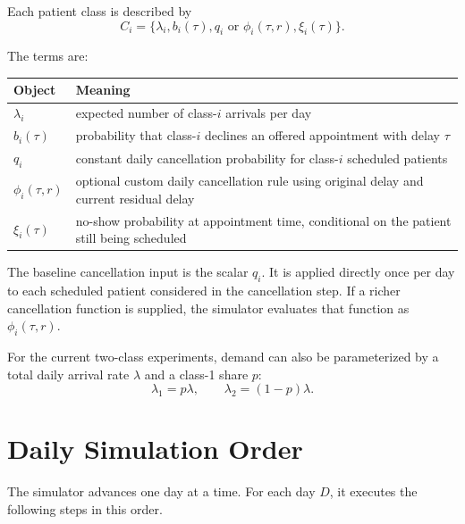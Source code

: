 \documentclass[11pt]{article}
\begin{document}
Each patient class is described by
\[
C_i = \{\lambda_i, b_i(\tau), q_i \text{ or } \phi_i(\tau,r), \xi_i(\tau)\}.
\]

The terms are:
\begin{center}
\small
\begin{tabular}{L{0.22\textwidth} L{0.68\textwidth}}
\toprule
\textbf{Object} & \textbf{Meaning} \\
\midrule
\(\lambda_i\) & expected number of class-\(i\) arrivals per day \\
\addlinespace
\(b_i(\tau)\) & probability that class-\(i\) declines an offered appointment with delay \(\tau\) \\
\addlinespace
\(q_i\) & constant daily cancellation probability for class-\(i\) scheduled patients \\
\addlinespace
\(\phi_i(\tau,r)\) & optional custom daily cancellation rule using original delay and current residual delay \\
\addlinespace
\(\xi_i(\tau)\) & no-show probability at appointment time, conditional on the patient still being scheduled \\
\bottomrule
\end{tabular}
\normalsize
\end{center}

The baseline cancellation input is the scalar \(q_i\). It is applied directly once per day to each
scheduled patient considered in the cancellation step. If a richer cancellation function is supplied,
the simulator evaluates that function as \(\phi_i(\tau,r)\).

For the current two-class experiments, demand can also be parameterized by a total daily arrival
rate \(\lambda\) and a class-1 share \(p\):
\[
\lambda_1 = p\lambda,
\qquad
\lambda_2 = (1-p)\lambda.
\]

\section{Daily Simulation Order}

The simulator advances one day at a time. For each day \(D\), it executes the following steps in
this order.
\end{document}
